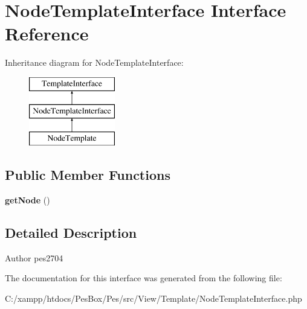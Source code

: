 \hypertarget{interface_pes_1_1_view_1_1_template_1_1_node_template_interface}{}\section{Node\+Template\+Interface Interface Reference}
\label{interface_pes_1_1_view_1_1_template_1_1_node_template_interface}
Inheritance diagram for Node\+Template\+Interface\+:\begin{figure}[H]
\begin{center}
\leavevmode
\includegraphics[height=3.000000cm]{interface_pes_1_1_view_1_1_template_1_1_node_template_interface}
\end{center}
\end{figure}
\subsection*{Public Member Functions}
\begin{DoxyCompactItemize}
\item 
\mbox{\label{interface_pes_1_1_view_1_1_template_1_1_node_template_interface_a3a0d17930cbcc57bef84064afcc1a837}} 
{\bfseries get\+Node} ()
\end{DoxyCompactItemize}


\subsection{Detailed Description}
\begin{DoxyAuthor}{Author}
pes2704 
\end{DoxyAuthor}


The documentation for this interface was generated from the following file\+:\begin{DoxyCompactItemize}
\item 
C\+:/xampp/htdocs/\+Pes\+Box/\+Pes/src/\+View/\+Template/Node\+Template\+Interface.\+php\end{DoxyCompactItemize}
